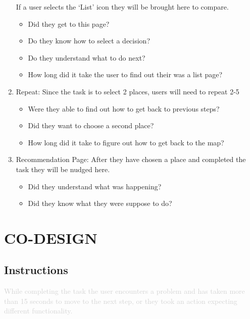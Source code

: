 \begin{enumerate}
            If a user selects the ‘List’ icon they will be brought here to compare.
                \begin{itemize}            
                    \item Did they get to this page?
                    \item Do they know how to select a decision?
                    \item Do they understand what to do next?
                    \item How long did it take the user to find out their was a list page?
                \end{itemize}
            \item Repeat: 
            Since the task is to select 2 places, users will need to repeat 2-5
                \begin{itemize}
                    \item Were they able to find out how to get back to previous steps?
                    \item Did they want to choose a second place?
                    \item How long did it take to figure out how to get back to the map?
                \end{itemize}
            \item Recommendation Page:
            After they have chosen a place and completed the task they will be nudged here.
                \begin{itemize}
                    \item Did they understand what was happening?
                    \item Did they know what they were suppose to do?
                \end{itemize}        
        \end{enumerate}

\section*{CO-DESIGN}

    \subsection*{Instructions}
        \textcolor{lightgray}{While completing the task the user encounters a problem and has taken more than 15 seconds to move to the next step, or they took an action expecting different functionality.}

